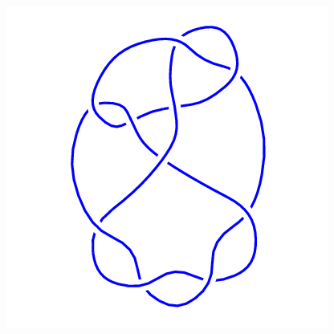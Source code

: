 \begin{figure}[H]
\begin{minipage}[b]{.18\linewidth}
	\end{minipage}
	\begin{minipage}[b]{.18\linewidth}
		\centering
		\includegraphics[width=\linewidth]{../data/10_126.png}
	\end{minipage}
\end{figure}
